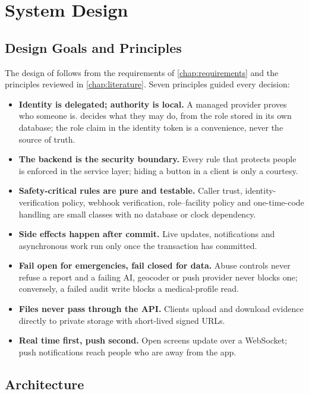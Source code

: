 \chapter{System Design}\label{chap:design}

\section{Design Goals and Principles}

The design of \ProjectName{} follows from the requirements of \cref{chap:requirements} and the principles reviewed in
\cref{chap:literature}. Seven principles guided every decision:

\begin{itemize}
  \item \textbf{Identity is delegated; authority is local.} A managed provider proves who someone is. \ProjectName{}
        decides what they may do, from the role stored in its own database; the role claim in the identity token is a
        convenience, never the source of truth.
  \item \textbf{The backend is the security boundary.} Every rule that protects people is enforced in the service
        layer; hiding a button in a client is only a courtesy.
  \item \textbf{Safety-critical rules are pure and testable.} Caller trust, identity-verification policy, webhook
        verification, role--facility policy and one-time-code handling are small classes with no database or clock
        dependency.
  \item \textbf{Side effects happen after commit.} Live updates, notifications and asynchronous work run only once the
        transaction has committed.
  \item \textbf{Fail open for emergencies, fail closed for data.} Abuse controls never refuse a report and a failing AI,
        geocoder or push provider never blocks one; conversely, a failed audit write blocks a medical-profile read.
  \item \textbf{Files never pass through the API.} Clients upload and download evidence directly to private storage with
        short-lived signed URLs.
  \item \textbf{Real time first, push second.} Open screens update over a WebSocket; push notifications reach people who
        are away from the app.
\end{itemize}

\section{Architecture}

